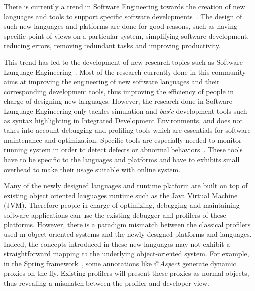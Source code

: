 
There is currently a trend in Software Engineering towards the creation of new languages and tools to support specific  software developments~\cite{whittle2014state, van2000domain,hutchinson2011empirical}. 
The design of such new languages and platforms are done for good reasons, such as  having specific point of views on a particular system, simplifying software development, reducing errors, removing redundant tasks and improving productivity. 

This trend has led to the development of new research topics such as Software Language Engineering~\cite{sle}. Most of the research currently done in this community aims at improving the engineering of new software languages and their corresponding development tools, thus improving the efficiency of people in charge of designing new languages. 
However, the research done in Software Language Engineering only tackles simulation and \textit{basic} development tools such as syntax highlighting in Integrated Development Environments, and does not takes into account debugging and profiling tools which are essentials for software maintenance and optimization.
Specific tools are especially needed to monitor running system in order to detect defects or abnormal behaviors~\cite{duesterwald2000software,Jovic:2011:CMY:2076021.2048081}.
These tools have to be specific to the languages and platforms and have to exhibits small overhead to make their usage suitable with online system.

Many of the newly designed languages and runtime platform are built on top of existing object oriented languages runtime such as the Java Virtual Machine (JVM). 
Therefore people in charge of optimizing, debugging and maintaining software applications can use the existing debugger and profilers of these platforms. 
However, there is a paradigm mismatch between the classical profilers used in object-oriented systems and the newly designed platforms and languages. 
Indeed, the concepts introduced in these new languages may not exhibit a straightforward mapping to the underlying object-oriented system. For example, in the Spring framework~\cite{laddad2009aspectj}, some annotations like $@Aspect$ generate dynamic proxies on the fly. Existing profilers will present these proxies as normal objects, thus revealing a mismatch between the profiler and developer view. 

